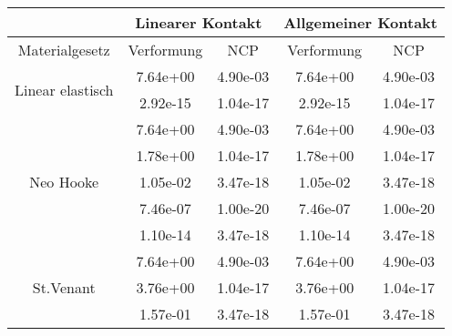 \begin{table} 
\centering 
\begin{tabular}{c|cc|cc|} 
\cline{2-5} 
 & \multicolumn{2}{|c|}{Linearer Kontakt} & \multicolumn{2}{|c|}{Allgemeiner Kontakt} \\ 
\hline 
\multicolumn{1}{|c|}{Materialgesetz} & \multicolumn{1}{c|}{Verformung} & \multicolumn{1}{c|}{NCP} & \multicolumn{1}{c|}{Verformung} & \multicolumn{1}{c|}{NCP} \\ 
\hline 
\multicolumn{1}{|c|}{\multirow{2}{*}{Linear elastisch}} &\multicolumn{1}{|c|}{  7.64e+00} & \multicolumn{1}{|c|}{  4.90e-03} & \multicolumn{1}{|c|}{  7.64e+00} & \multicolumn{1}{|c|}{  4.90e-03} \\ 
\multicolumn{1}{|c|}{} & \multicolumn{1}{|c|}{  2.92e-15} & \multicolumn{1}{|c|}{  1.04e-17} & \multicolumn{1}{|c|}{  2.92e-15} & \multicolumn{1}{|c|}{  1.04e-17} \\ 
\hline 
\multicolumn{1}{|c|}{\multirow{5}{*}{Neo Hooke}} &\multicolumn{1}{|c|}{  7.64e+00} & \multicolumn{1}{|c|}{  4.90e-03} & \multicolumn{1}{|c|}{  7.64e+00} & \multicolumn{1}{|c|}{  4.90e-03} \\ 
\multicolumn{1}{|c|}{} & \multicolumn{1}{|c|}{  1.78e+00} & \multicolumn{1}{|c|}{  1.04e-17} & \multicolumn{1}{|c|}{  1.78e+00} & \multicolumn{1}{|c|}{  1.04e-17} \\ 
\multicolumn{1}{|c|}{} & \multicolumn{1}{|c|}{  1.05e-02} & \multicolumn{1}{|c|}{  3.47e-18} & \multicolumn{1}{|c|}{  1.05e-02} & \multicolumn{1}{|c|}{  3.47e-18} \\ 
\multicolumn{1}{|c|}{} & \multicolumn{1}{|c|}{  7.46e-07} & \multicolumn{1}{|c|}{  1.00e-20} & \multicolumn{1}{|c|}{  7.46e-07} & \multicolumn{1}{|c|}{  1.00e-20} \\ 
\multicolumn{1}{|c|}{} & \multicolumn{1}{|c|}{  1.10e-14} & \multicolumn{1}{|c|}{  3.47e-18} & \multicolumn{1}{|c|}{  1.10e-14} & \multicolumn{1}{|c|}{  3.47e-18} \\ 
\hline 
\multicolumn{1}{|c|}{\multirow{6}{*}{St.Venant}} &\multicolumn{1}{|c|}{  7.64e+00} & \multicolumn{1}{|c|}{  4.90e-03} & \multicolumn{1}{|c|}{  7.64e+00} & \multicolumn{1}{|c|}{  4.90e-03} \\ 
\multicolumn{1}{|c|}{} & \multicolumn{1}{|c|}{  3.76e+00} & \multicolumn{1}{|c|}{  1.04e-17} & \multicolumn{1}{|c|}{  3.76e+00} & \multicolumn{1}{|c|}{  1.04e-17} \\ 
\multicolumn{1}{|c|}{} & \multicolumn{1}{|c|}{  1.57e-01} & \multicolumn{1}{|c|}{  3.47e-18} & \multicolumn{1}{|c|}{  1.57e-01} & \multicolumn{1}{|c|}{  3.47e-18} \\ 

\end{tabular}
\end{table}

